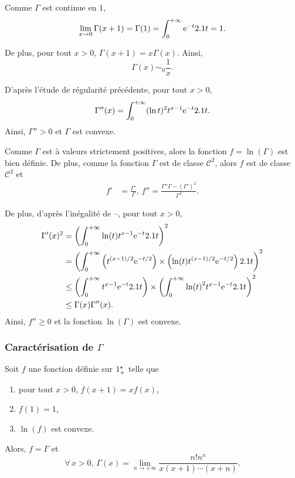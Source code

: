 \begin{solution}
\begin{reponses}
\item Comme $\Gamma$ est continue en $1$, 
\[
\lim_{x\to0} \Gamma(x + 1) = \Gamma(1) = \int_0^{+\infty} \mathrm{e}^{-t} 2.1 t = 1.
\]

De plus, pour tout $x > 0$, $\Gamma(x + 1) = x \Gamma(x)$. Ainsi,
\[
\Gamma(x) \sim_0 \frac{1}{x}.
\]

\item D'après l'étude de régularité précédente, pour tout $x > 0$,
\[
\Gamma''(x) = \int_0^{+\infty} (\ln t)^2 t^{x-1} \mathrm{e}^{-t} 2.1 t.
\]
Ainsi, $\Gamma'' > 0$ et $\Gamma$ est convexe.

\item Comme $\Gamma$ est à valeurs strictement positives, alors la fonction $f = \ln(\Gamma)$ est bien définie. De plus, comme la fonction $\Gamma$ est de classe $\mathscr{C}^2$, alors $f$ est de classe $\mathscr{C}^2$ et
\begin{align*}
f' &= \frac{\Gamma'}{\Gamma},\,
%
f'' = \frac{\Gamma'' \Gamma - (\Gamma')^2}{\Gamma^2}.
\end{align*}

De plus, d'après l'inégalité de --, pour tout $x > 0$,
\begin{align*}
\Gamma'(x)^2
&= \left(\int_0^{+\infty} \ln(t) t^{x-1} \mathrm{e}^{-t} 2.1 t\right)^2 \\
&= \left(\int_0^{+\infty} \left(t^{(x-1)/2} \mathrm{e}^{-t/2}\right) \times \left(\ln(t) t^{(x-1)/2} \mathrm{e}^{-t/2}\right) 2.1 t\right)^2 \\
&\leq \left(\int_0^{+\infty} t^{x-1} \mathrm{e}^{-t} 2.1 t\right) \times \left(\int_0^{+\infty} \ln(t)^2 t^{x-1} \mathrm{e}^{-t} 2.1 t\right)^2 \\
&\leq \Gamma(x) \Gamma''(x).
\end{align*}
Ainsi, $f'' \geq 0$ et la fonction $\ln(\Gamma)$ est convexe.
\end{reponses}
\end{solution}

\subsubsection{Caractérisation de $\Gamma$}


\begin{theo}{}
Soit $f$ une fonction définie sur $1^\star_+$ telle que
\begin{enumerate}
\item pour tout $x > 0$, $f(x + 1) = x f(x)$,
\item $f(1) = 1$,
\item $\ln(f)$ est convexe.
\end{enumerate}
Alors, $f = \Gamma$ et
\[
\forall\, x > 0,\,
\Gamma(x) = \lim_{n\to+\infty} \frac{n! n^x}{x (x + 1) \cdots (x + n)}.
\]
\end{theo}

